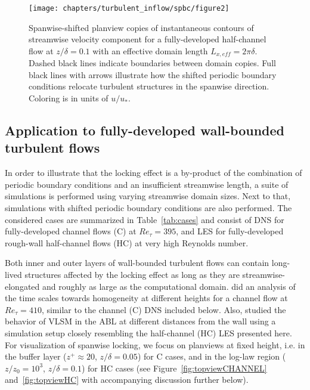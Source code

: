	\begin{figure}
		\centering
		\texttt{[image: chapters/turbulent\_inflow/spbc/figure2]}
		\caption[Spanwise-shifted planview copies of instantaneous contours of streamwise velocity component for a fully-developed half-channel flow at $z/\delta = 0.1$ with an effective domain length $L_{x,eff} = 2\pi\delta$.]{Spanwise-shifted planview copies of instantaneous contours of streamwise velocity component for a fully-developed half-channel flow at $z/\delta = 0.1$ with an effective domain length $L_{x,eff} = 2\pi\delta$. Dashed black lines indicate boundaries between domain copies. Full black lines with arrows illustrate how the shifted periodic boundary conditions relocate turbulent structures in the spanwise direction. Coloring is in units of $u/u_*$. }
		\label{fig:topview_shift}
	\end{figure}
	
	
	\subsection{Application to fully-developed wall-bounded turbulent flows}\label{sec:inflow_shifted_application}
		In order to illustrate that the locking effect is a by-product of the combination of periodic boundary conditions and an insufficient streamwise length, a suite of simulations is performed using varying streamwise domain sizes. Next to that, simulations with shifted periodic boundary conditions are also performed. The considered cases are summarized in Table~\ref{tab:cases} and consist of DNS for fully-developed channel flows (C) at $Re_\tau = 395$, and LES for fully-developed rough-wall half-channel flows (HC) at very high Reynolds number. 
		
		Both inner and outer layers of wall-bounded turbulent flows can contain long-lived structures affected by the locking effect as long as they are streamwise-elongated and roughly as large as the computational domain. \cite{fishpool2009persistent} did an analysis of the time scales towards homogeneity at different heights for a channel flow at $Re_\tau = 410$, similar to the channel (C) DNS included below. Also, \cite{fang2015large} studied the behavior of VLSM in the ABL at different distances from the wall using a simulation setup closely resembling the half-channel (HC) LES presented here. For visualization of spanwise locking, we focus on planviews at fixed height, i.e. in the buffer layer ($z^+ \approx 20 $, $z/\delta = 0.05$) for C cases, and in the log-law region ($z/z_0 = 10^3$, $z/\delta = 0.1$) for HC cases (see Figure~\ref{fig:topviewCHANNEL} and~\ref{fig:topviewHC} with accompanying discussion further below).
		
